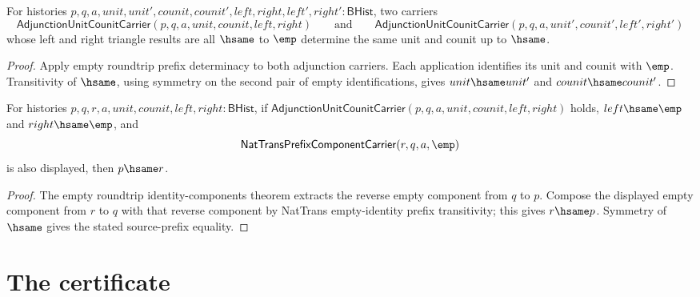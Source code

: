 \begin{theorem}
\label{thm:equivcat-adjunction-empty-roundtrip-unit-counit-deterministic}
For histories $p,q,a,unit,unit',counit,counit',left,right,left',right':\mathsf{BHist}$,
two carriers
$$
\mathsf{AdjunctionUnitCounitCarrier}(p,q,a,unit,counit,left,right)
\qquad\text{and}\qquad
\mathsf{AdjunctionUnitCounitCarrier}(p,q,a,unit',counit',left',right')
$$
whose left and right triangle results are all $\hsame$ to $\emp$ determine the
same unit and counit up to $\hsame$.
\end{theorem}
\begin{proof}
Apply empty roundtrip prefix determinacy to both adjunction carriers. Each
application identifies its unit and counit with $\emp$. Transitivity of
$\hsame$, using symmetry on the second pair of empty identifications, gives
$unit\hsame unit'$ and $counit\hsame counit'$.
\end{proof}

\begin{theorem}
\label{thm:equivcat-adjunction-empty-roundtrip-source-prefix-deterministic}
For histories $p,q,r,a,unit,counit,left,right:\mathsf{BHist}$, if
$\mathsf{AdjunctionUnitCounitCarrier}(p,q,a,unit,counit,left,right)$ holds,
$left\hsame\emp$ and $right\hsame\emp$, and
$$
\mathsf{NatTransPrefixComponentCarrier}(r,q,a,\emp)
$$
is also displayed, then $p\hsame r$.
\end{theorem}
\begin{proof}
The empty roundtrip identity-components theorem extracts the reverse empty
component from $q$ to $p$. Compose the displayed empty component from $r$ to
$q$ with that reverse component by NatTrans empty-identity prefix
transitivity; this gives $r\hsame p$. Symmetry of $\hsame$ gives the stated
source-prefix equality.
\end{proof}

\section{The certificate}
\label{sec:equivcat-certificate}

